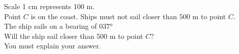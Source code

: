 \begin{enumerate}
\begin{figure}[H]
  \end{figure}
  Scale	1 cm represents 100 m.\\
  Point $C$ is on the coast. Ships must not sail closer than $500$ m to point $C$.\\
  The ship sails on a bearing of 0\ang{37}\\
  Will the ship sail closer than 500 m to point $C$?\\
  You must explain your answer.\strch




  




\end{enumerate}